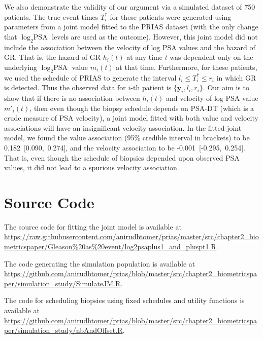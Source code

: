 \begin{subappendices}
We also demonstrate the validity of our argument via a simulated dataset of 750 patients. The true event times $T^*_i$ for these patients were generated using parameters from a joint model fitted to the PRIAS dataset (with the only change that $\log_2 \mbox{PSA}$ levels are used as the outcome). However, this joint model did not include the association between the velocity of log PSA values and the hazard of GR. That is, the hazard of GR $h_i(t)$ at any time $t$ was dependent only on the underlying $\log_2 \mbox{PSA}$ value $m_i(t)$ at that time. Furthermore, for these patients, we used the schedule of PRIAS to generate the interval $l_i \leq T^*_i \leq r_i$ in which GR is detected. Thus the observed data for $i$-th patient is $\{\boldsymbol{y}_i, l_i, r_i\}$. Our aim is to show that if there is no association between $h_i(t)$ and velocity of log PSA value $m'_i(t)$, then even though the biopsy schedule depends on PSA-DT (which is a crude measure of PSA velocity), a joint model fitted with both value and velocity associations will have an insignificant velocity association. In the fitted joint model, we found the value association (95\% credible interval in brackets) to be 0.182~[0.090,~0.274], and the velocity association to be -0.001~[-0.295,~0.254]. That is, even though the schedule of biopsies depended upon observed PSA values, it did not lead to a spurious velocity association. 

\section{Source Code}
The source code for fitting the joint model is available at \url{https://raw.githubusercontent.com/anirudhtomer/prias/master/src/chapter2_biometricspaper/Gleason%20as%20event/log2psaplus1_and_pluspt1.R}. 

The code generating the simulation population is available at \url{https://github.com/anirudhtomer/prias/blob/master/src/chapter2_biometricspaper/simulation_study/SimulateJM.R}. 

The code for scheduling biopsies using fixed schedules and utility functions is available at \url{https://github.com/anirudhtomer/prias/blob/master/src/chapter2_biometricspaper/simulation_study/nbAndOffset.R}.

\end{subappendices}